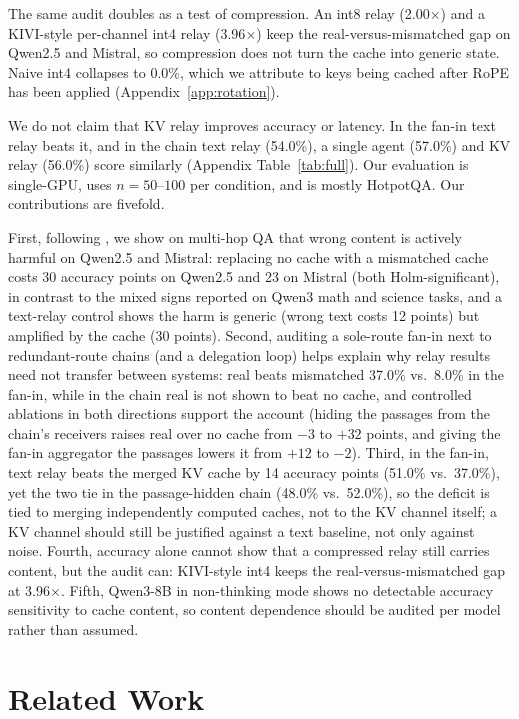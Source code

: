 \documentclass[11pt]{article}
\begin{document}
The same audit doubles as a test of compression. An int8 relay
(2.00$\times$) and a KIVI-style per-channel int4 relay \citep{kivi2024}
(3.96$\times$) keep the real-versus-mismatched gap on Qwen2.5 and Mistral, so
compression does not turn the cache into generic state. Naive int4 collapses to
0.0\%, which we attribute to keys being cached after RoPE has been applied
(Appendix~\ref{app:rotation}).

We do not claim that KV relay improves accuracy or latency. In the fan-in
text relay beats it, and in the chain text relay (54.0\%), a single agent (57.0\%)
and KV relay (56.0\%) score similarly (Appendix Table~\ref{tab:full}). Our
evaluation is single-GPU, uses $n{=}50$--$100$ per condition, and is mostly
HotpotQA. Our contributions are fivefold.

First, following \citet{zhangemu2026}, we show on multi-hop QA that wrong content is
actively harmful on Qwen2.5 and Mistral: replacing no cache with a mismatched
cache costs 30 accuracy points on Qwen2.5 and 23 on Mistral (both
Holm-significant), in contrast to the mixed signs reported on Qwen3 math and
science tasks, and a text-relay control shows the harm is generic (wrong text costs 12
points) but amplified by the cache (30 points). Second, auditing a sole-route fan-in
next to redundant-route chains (and a delegation loop) helps explain why relay
results need not transfer between systems: real beats mismatched 37.0\% vs.\ 8.0\%
in the fan-in, while in the chain real is not shown to beat no cache, and controlled
ablations in both directions support the account (hiding the passages from the chain's
receivers raises real over no cache from $-3$ to $+32$ points, and giving the fan-in
aggregator the passages lowers it from $+12$ to $-2$). Third, in the fan-in, text relay
beats the merged KV cache by 14 accuracy points (51.0\% vs.\ 37.0\%), yet the two tie
in the passage-hidden chain (48.0\% vs.\ 52.0\%), so the deficit is tied to merging
independently computed caches, not to the KV channel itself; a KV channel should still
be justified against a text baseline, not only against noise. Fourth, accuracy alone
cannot show that a compressed relay still carries content, but the audit can: KIVI-style
int4 keeps the real-versus-mismatched gap at 3.96$\times$. Fifth, Qwen3-8B in
non-thinking mode shows no detectable accuracy sensitivity to cache content, so
content dependence should be audited per model rather than assumed.


\section{Related Work}
\label{sec:related}
\end{document}
